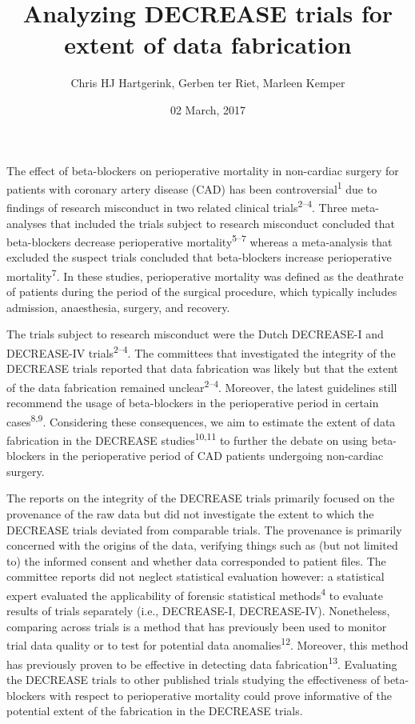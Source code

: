 \documentclass[]{article}
\title{Analyzing DECREASE trials for extent of data fabrication}
\author{Chris HJ Hartgerink, Gerben ter Riet, Marleen Kemper}
\date{02 March, 2017}
\begin{document}
\maketitle

The effect of beta-blockers on perioperative mortality in non-cardiac
surgery for patients with coronary artery disease (CAD) has been
controversial\textsuperscript{1} due to findings of research misconduct
in two related clinical trials\textsuperscript{2--4}. Three
meta-analyses that included the trials subject to research misconduct
concluded that beta-blockers decrease perioperative
mortality\textsuperscript{5--7} whereas a meta-analysis that excluded
the suspect trials concluded that beta-blockers increase perioperative
mortality\textsuperscript{7}. In these studies, perioperative mortality
was defined as the deathrate of patients during the period of the
surgical procedure, which typically includes admission, anaesthesia,
surgery, and recovery.

The trials subject to research misconduct were the Dutch DECREASE-I and
DECREASE-IV trials\textsuperscript{2--4}. The committees that
investigated the integrity of the DECREASE trials reported that data
fabrication was likely but that the extent of the data fabrication
remained unclear\textsuperscript{2--4}. Moreover, the latest guidelines
still recommend the usage of beta-blockers in the perioperative period
in certain cases\textsuperscript{8,9}. Considering these consequences,
we aim to estimate the extent of data fabrication in the DECREASE
studies\textsuperscript{10,11} to further the debate on using
beta-blockers in the perioperative period of CAD patients undergoing
non-cardiac surgery.

The reports on the integrity of the DECREASE trials primarily focused on
the provenance of the raw data but did not investigate the extent to
which the DECREASE trials deviated from comparable trials. The
provenance is primarily concerned with the origins of the data,
verifying things such as (but not limited to) the informed consent and
whether data corresponded to patient files. The committee reports did
not neglect statistical evaluation however: a statistical expert
evaluated the applicability of forensic statistical
methods\textsuperscript{4} to evaluate results of trials separately
(i.e., DECREASE-I, DECREASE-IV). Nonetheless, comparing across trials is
a method that has previously been used to monitor trial data quality or
to test for potential data anomalies\textsuperscript{12}. Moreover, this
method has previously proven to be effective in detecting data
fabrication\textsuperscript{13}. Evaluating the DECREASE trials to other
published trials studying the effectiveness of beta-blockers with
respect to perioperative mortality could prove informative of the
potential extent of the fabrication in the DECREASE trials.
\end{document}
